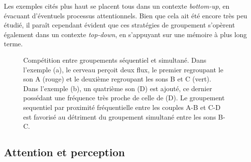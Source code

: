 Les exemples cités plus haut se placent tous dans un contexte \emph{bottom-up}, en évacuant d'éventuels processus attentionnels. Bien que cela ait été encore très peu étudié, il paraît cependant évident que ces stratégies de groupement s’opèrent également dans un contexte \emph{top-down}, en s'appuyant sur une mémoire à plus long terme.

\begin{figure}[bth]
        \myfloatalign
        \caption[Compétition entre groupements séquentiel et simultané]{Compétition entre groupements séquentiel et simultané. Dans l'exemple (a), le cerveau perçoit deux flux, le premier regroupant le son A (rouge) et le deuxième regroupant les sons B et C (vert). Dans l'exemple (b), un quatrième son (D) est ajouté, ce dernier possédant une fréquence très proche de celle de (D). Le groupement sequentiel par proximité fréquentielle entre les couples A-B et C-D est favorisé au détriment du groupement simultané entre les sons B-C.}\label{fig:simvsseq}
\end{figure}

\subsection{Attention et perception}

